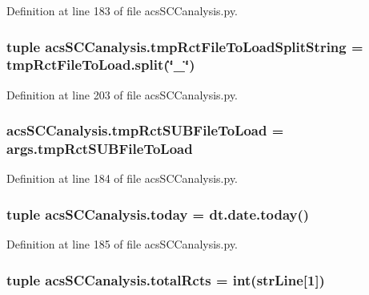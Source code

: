 Definition at line 183 of file acs\+S\+C\+Canalysis.\+py.

\hypertarget{a00130_add910e17b3f1fe61cdbaf8ce60ec0e20}{
\subsubsection[{tmp\+Rct\+File\+To\+Load\+Split\+String}]{\setlength{\rightskip}{0pt plus 5cm}tuple acs\+S\+C\+Canalysis.\+tmp\+Rct\+File\+To\+Load\+Split\+String = {\bf tmp\+Rct\+File\+To\+Load.\+split}(\char`\"{}\+\_\+\char`\"{})}}\label{a00130_add910e17b3f1fe61cdbaf8ce60ec0e20}


Definition at line 203 of file acs\+S\+C\+Canalysis.\+py.

\hypertarget{a00130_a8dd4ba8a8e597b56376879ba4cf1f41d}{
\subsubsection[{tmp\+Rct\+S\+U\+B\+File\+To\+Load}]{\setlength{\rightskip}{0pt plus 5cm}acs\+S\+C\+Canalysis.\+tmp\+Rct\+S\+U\+B\+File\+To\+Load = args.\+tmp\+Rct\+S\+U\+B\+File\+To\+Load}}\label{a00130_a8dd4ba8a8e597b56376879ba4cf1f41d}


Definition at line 184 of file acs\+S\+C\+Canalysis.\+py.

\hypertarget{a00130_a5498b0a6851ae4d3b2c3035093564e47}{
\subsubsection[{today}]{\setlength{\rightskip}{0pt plus 5cm}tuple acs\+S\+C\+Canalysis.\+today = dt.\+date.\+today()}}\label{a00130_a5498b0a6851ae4d3b2c3035093564e47}


Definition at line 185 of file acs\+S\+C\+Canalysis.\+py.

\hypertarget{a00130_a9f0e87ff21f3597668f5ad076224da87}{
\subsubsection[{total\+Rcts}]{\setlength{\rightskip}{0pt plus 5cm}tuple acs\+S\+C\+Canalysis.\+total\+Rcts = int({\bf str\+Line}\mbox{[}1\mbox{]})}}\label{a00130_a9f0e87ff21f3597668f5ad076224da87}


